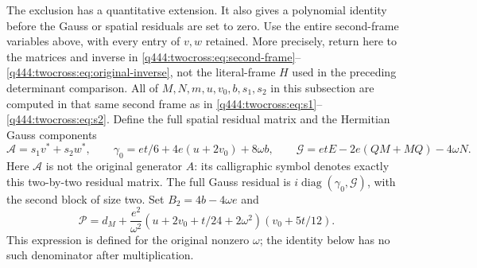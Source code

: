 The exclusion has a quantitative extension. It also gives a polynomial
identity before the Gauss or spatial residuals are set to zero. Use the
entire second-frame variables above, with every entry of $v,w$ retained.
More precisely, return here to the matrices and inverse in
\eqref{q444:twocross:eq:second-frame}--\eqref{q444:twocross:eq:original-inverse},
not the literal-frame $H$ used in the preceding determinant comparison.
All of $M,N,m,u,v_0,b,s_1,s_2$ in this subsection are computed in
that same second frame as in \eqref{q444:twocross:eq:s1}--\eqref{q444:twocross:eq:s2}.
Define the full spatial residual matrix and the Hermitian Gauss components
\[
 \mathcal A=s_1v^*+s_2w^*,\qquad
 \gamma_0=et/6+4e(u+2v_0)+8\omega b,
 \qquad \mathcal G=etE-2e(QM+MQ)-4\omega N.
\]
Here $\mathcal A$ is not the original generator $A$: its calligraphic
symbol denotes exactly this two-by-two residual matrix. The full Gauss
residual is $i\operatorname{diag}(\gamma_0,\mathcal G)$, with the
second block of size two. Set $B_2=4b-4\omega e$ and
\[
 \mathcal P=d_M+\frac{e^2}{\omega^2}
       (u+2v_0+t/24+2\omega^2)(v_0+5t/12).
\]
This expression is defined for the original nonzero $\omega$; the
identity below has no such denominator after multiplication.

